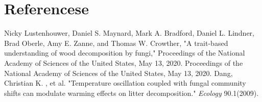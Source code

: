 \section*{Referencese}
\begin{thebibliography}{99}
    Nicky Lustenhouwer, Daniel S. Maynard, Mark A. Bradford, Daniel L. Lindner, Brad Oberle,
    Amy E. Zanne, and Thomas W. Crowther, "A trait-based understanding of wood decomposition by
    fungi," Proceedings of the National Academy of Sciences of the United States, May 13, 2020.
    Proceedings of the National Academy of Sciences of the United States, May 13, 2020.
    Dang, Christian K. , et al. "Temperature oscillation coupled with fungal community shifts can modulate warming effects on litter decomposition." \emph{Ecology} 90.1(2009).
\end{thebibliography}